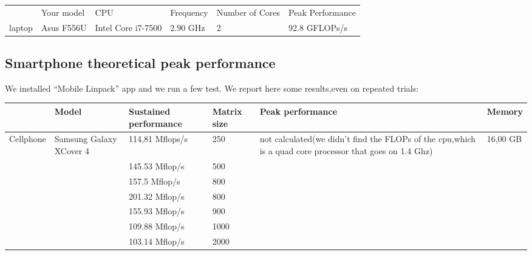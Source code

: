 \documentclass[11pt]{scrartcl} %
\begin{document}

\begin{table}[H]
		\begin{tabular}[H]{l| l| l| l| l| l }
			&Your model&CPU&Frequency&Number of Cores&Peak Performance\\
			laptop& Asus F556U & Intel Core i7-7500 &$2.90$ GHz&2&92.8 GFLOPs/s
		\end{tabular}
	\label{Result}
\end{table}

\subsection{Smartphone theoretical peak performance}
We installed "`Mobile Linpack"' app and we run a few test. We report here some results,even on repeated trials: 
\begin{adjustwidth}{-2cm}{}
	\begin{tabular}[H]{l| p{}| l |l| p{}|l }
		\hline
			&Model& Sustained performance&Matrix size&Peak performance&Memory\\
			\hline
			Cellphone&Samsung Galaxy XCover 4 &114,81 Mflops/s &250 &not calculated(we didn't find the FLOPs of the cpu,which is a quad core processor that goes on 1.4 Ghz)&16,00 GB\\
			& &145.53 Mflop/s&500& &\\
			& &157.5 Mflop/s&800& &\\
			& &201.32 Mflop/s&800& &\\
			& &155.93 Mflop/s&900& &\\
			& &109.88 Mflop/s&1000& &\\
			& &103.14 Mflop/s&2000& &\\
		\end{tabular}
\end{adjustwidth}
\end{document}
